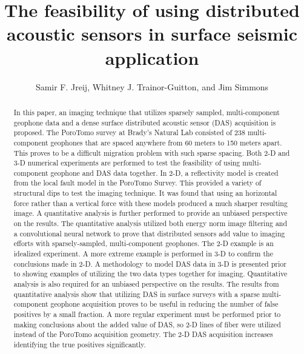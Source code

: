 \title{The feasibility of using distributed acoustic sensors in surface seismic application}

\address{Colorado School of Mines, \\ 1500 Illinois Ave, \\ Golden, CO, 80401}

\author{Samir F. Jreij, Whitney J. Trainor-Guitton, and Jim Simmons}



\maketitle

\begin{abstract}


  In this paper, an imaging technique that utilizes sparsely sampled, multi-component geophone data and a dense surface distributed acoustic sensor (DAS) acquisition is proposed. The PoroTomo survey at Brady's Natural Lab consisted of 238 multi-component geophones that are spaced anywhere from 60 meters to 150 meters apart. This proves to be a difficult migration problem with such sparse spacing. Both 2-D and 3-D numerical experiments are performed to test the feasibility of using multi-component geophone and DAS data together. In 2-D, a reflectivity model is created from the local fault model in the PoroTomo Survey. This provided a variety of structural dips to test the imaging technique. It was found that using an horizontal force rather than a vertical force with these models produced a much sharper resulting image. A quantitative analysis is further performed to provide an unbiased perspective on the results. The quantitative analysis utilized both energy norm image filtering and a convolutional neural network to prove that distributed sensors add value to imaging efforts with sparsely-sampled, multi-component geophones. The 2-D example is an idealized experiment. A more extreme example is performed in 3-D to confirm the conclusions made in 2-D. A methodology to model DAS data in 3-D is presented prior to showing examples of utilizing the two data types together for imaging. Quantitative analysis is also required for an unbiased perspective on  the results. The results from quantitative analysis show that utilizing DAS in surface surveys with a sparse multi-component geophone acquisition proves to be useful in reducing the number of false positives by a small fraction. A more regular experiment must be performed prior to making conclusions about the added value of DAS, so 2-D lines of fiber were utilized instead of the PoroTomo acquisition geometry. The 2-D DAS acquisition increases identifying the true positives significantly.


\end{abstract}

